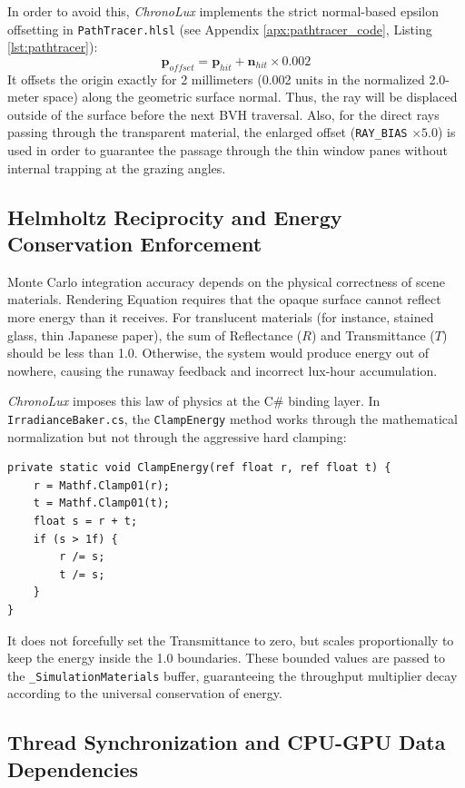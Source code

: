 In order to avoid this, \textit{ChronoLux} implements the strict normal-based epsilon offsetting in \texttt{PathTracer.hlsl} (see Appendix \ref{apx:pathtracer_code}, Listing \ref{lst:pathtracer}):
\begin{equation}
    \mathbf{p}_{offset} = \mathbf{p}_{hit} + \mathbf{n}_{hit} \times 0.002
\end{equation}
It offsets the origin exactly for 2 millimeters (0.002 units in the normalized 2.0-meter space) along the geometric surface normal. Thus, the ray will be displaced outside of the surface before the next BVH traversal. Also, for the direct rays passing through the transparent material, the enlarged offset (\texttt{RAY\_BIAS} $\times 5.0$) is used in order to guarantee the passage through the thin window panes without internal trapping at the grazing angles.

\subsection{Helmholtz Reciprocity and Energy Conservation Enforcement}

Monte Carlo integration accuracy depends on the physical correctness of scene materials. Rendering Equation requires that the opaque surface cannot reflect more energy than it receives. For translucent materials (for instance, stained glass, thin Japanese paper), the sum of Reflectance ($R$) and Transmittance ($T$) should be less than 1.0. Otherwise, the system would produce energy out of nowhere, causing the runaway feedback and incorrect lux-hour accumulation.

\textit{ChronoLux} imposes this law of physics at the C\# binding layer. In \texttt{IrradianceBaker.cs}, the \texttt{ClampEnergy} method works through the mathematical normalization but not through the aggressive hard clamping:
\begin{lstlisting}[language={[Sharp]C}]
private static void ClampEnergy(ref float r, ref float t) {
	r = Mathf.Clamp01(r);
	t = Mathf.Clamp01(t);
	float s = r + t;
	if (s > 1f) {
		r /= s;
		t /= s;
	}
}
\end{lstlisting}

It does not forcefully set the Transmittance to zero, but scales proportionally to keep the energy inside the 1.0 boundaries. These bounded values are passed to the \texttt{\_SimulationMaterials} buffer, guaranteeing the throughput multiplier decay according to the universal conservation of energy.

\subsection{Thread Synchronization and CPU-GPU Data Dependencies}

